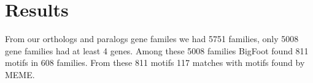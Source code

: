 \section*{Results}

From our orthologs and paralogs gene familes we had 5751 families, only 5008 gene families had at least 4 genes. Among these 5008 families BigFoot found 811 motifs in 608 families. From these 811 motifs 117 matches with motifs found by MEME.